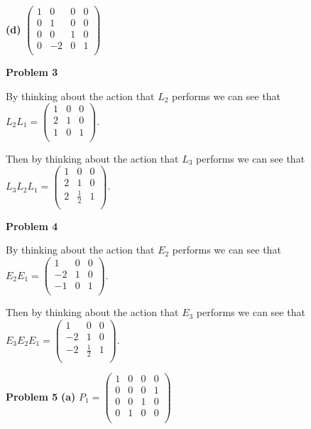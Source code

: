 \documentclass[oneside,12pt]{amsart}
\begin{document}
\bigskip

\textbf{(d)}
$
\begin{pmatrix}
1 & 0 & 0 & 0 \\
0 & 1 & 0 & 0 \\
0 & 0 & 1 & 0 \\
0 & -2 & 0 & 1 \\
\end{pmatrix}
$

\bigskip


\textbf{Problem 3}

\bigskip

By thinking about the action that $L_2$ performs we can see that
$L_2 L_1 =
\begin{pmatrix}
1 & 0 & 0\\
2 & 1 & 0\\
1 & 0 & 1\\
\end{pmatrix}
$.

\bigskip

Then by thinking about the action that $L_3$ performs we can see that
$L_3 L_2 L_1=
\begin{pmatrix}
1 &            0 & 0\\
2 &            1 & 0\\
2 & \frac{1}{2} & 1\\
\end{pmatrix}
$.


\bigskip


\textbf{Problem 4}

\bigskip

By thinking about the action that $E_2$ performs we can see that
$E_2 E_1 =
\begin{pmatrix}
 1   & 0  & 0\\
-2   & 1  & 0\\
-1   & 0  & 1\\
\end{pmatrix}
$.

\bigskip

Then by thinking about the action that $E_3$ performs we can see that
$E_3 E_2 E_1=
\begin{pmatrix}
 1   & 0           & 0\\
-2   & 1           & 0\\
-2   & \frac{1}{2} & 1\\
\end{pmatrix}
$.


\bigskip

\textbf{Problem 5}
\textbf{(a)}
$P_1=
\begin{pmatrix}
1 & 0 & 0 & 0\\
0 & 0 & 0 & 1\\
0 & 0 & 1 & 0\\
0 & 1 & 0 & 0\\
\end{pmatrix}
$
\end{document}
